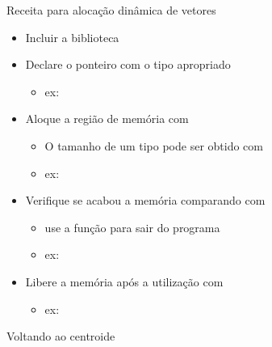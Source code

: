 \documentclass{beamer}
\begin{document}
\begin{frame}[<+->]{Receita para alocação dinâmica de vetores}
  \begin{itemize}
    \item Incluir a biblioteca \alert{}
    \item Declare o ponteiro com o tipo apropriado
      \begin{itemize}
        \item ex: 
      \end{itemize}
    \item Aloque a região de memória com 
      \begin{itemize}
        \item O tamanho de um tipo pode ser obtido com \alert{}
        \item ex: 
      \end{itemize}
    \item Verifique se acabou a memória comparando com \alert{}
      \begin{itemize}
        \item use a função  para sair do programa
        \item ex: 
      \end{itemize}
    \item Libere a memória após a utilização com \alert{}
      \begin{itemize}
        \item ex: 
      \end{itemize}
  \end{itemize}
\end{frame}

\begin{frame}{Voltando ao centroide}\pause
  
\end{frame}
\end{document}

